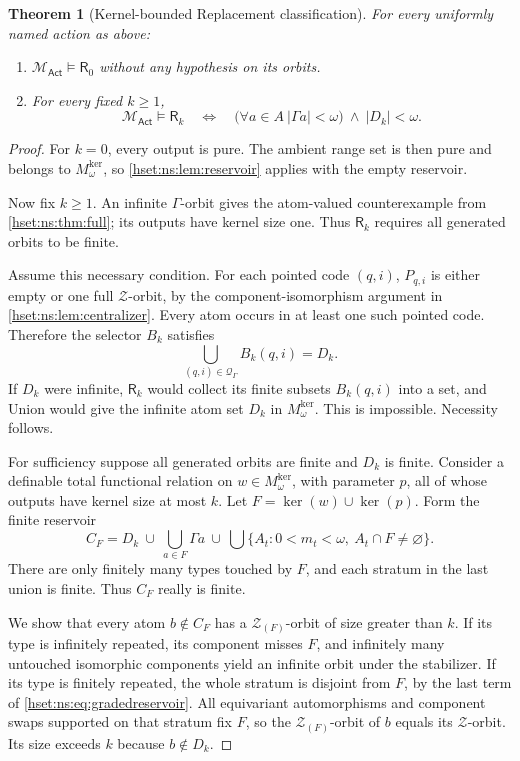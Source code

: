 \documentclass[11pt,letterpaper]{article}
\newtheorem{theorem}{Theorem}[section]
\theoremstyle{definition}
\theoremstyle{remark}
\newcommand{\kerat}{\operatorname{ker}}
\newcommand{\Mker}{M^{\mathrm{ker}}}
\newcommand{\Act}{\mathsf{Act}}
\newcommand{\MAct}{\mathcal M_{\Act}}
\newcommand{\abs}[1]{\lvert #1\rvert}
\newcommand{\calQ}{\mathcal Q_{\Gamma}}
\begin{document}
\begin{theorem}[Kernel-bounded Replacement classification]\label{hset:ns:thm:graded}
For every uniformly named action as above:
\begin{enumerate}
\item $\MAct\models\mathsf R_0$ without any hypothesis on its orbits.
\item For every fixed $k\ge1$,
\[
 \boxed{\quad
 \MAct\models\mathsf R_k
 \quad\Longleftrightarrow\quad
 \bigl(\forall a\in A\ \abs{\Gamma a}<\omega\bigr)
 \ \land\ \abs{D_k}<\omega.
 \quad}
\]
\end{enumerate}
\end{theorem}
\begin{proof}
For $k=0$, every output is pure. The ambient range set is then pure and belongs to $\Mker_\omega$, so \cref{hset:ns:lem:reservoir} applies with the empty reservoir.

Now fix $k\ge1$. An infinite $\Gamma$-orbit gives the atom-valued counterexample from \cref{hset:ns:thm:full}; its outputs have kernel size one. Thus $\mathsf R_k$ requires all generated orbits to be finite.

Assume this necessary condition. For each pointed code $(q,i)$, $P_{q,i}$ is either empty or one full $\mathcal Z$-orbit, by the component-isomorphism argument in \cref{hset:ns:lem:centralizer}. Every atom occurs in at least one such pointed code. Therefore the selector $B_k$ satisfies
\[
 \bigcup_{(q,i)\in\calQ}B_k(q,i)=D_k.
\]
If $D_k$ were infinite, $\mathsf R_k$ would collect its finite subsets $B_k(q,i)$ into a set, and Union would give the infinite atom set $D_k$ in $\Mker_\omega$. This is impossible. Necessity follows.

For sufficiency suppose all generated orbits are finite and $D_k$ is finite. Consider a definable total functional relation on $w\in \Mker_\omega$, with parameter $p$, all of whose outputs have kernel size at most $k$. Let $F=\kerat(w)\cup\kerat(p)$. Form the finite reservoir
\begin{equation}\label{hset:ns:eq:gradedreservoir}
 C_F=D_k\ \cup\ \bigcup_{a\in F}\Gamma a\ \cup\
 \bigcup\{A_t:0<m_t<\omega,\ A_t\cap F\ne\varnothing\}.
\end{equation}
There are only finitely many types touched by $F$, and each stratum in the last union is finite. Thus $C_F$ really is finite.

We show that every atom $b\notin C_F$ has a $\mathcal Z_{(F)}$-orbit of size greater than $k$. If its type is infinitely repeated, its component misses $F$, and infinitely many untouched isomorphic components yield an infinite orbit under the stabilizer. If its type is finitely repeated, the whole stratum is disjoint from $F$, by the last term of \eqref{hset:ns:eq:gradedreservoir}. All equivariant automorphisms and component swaps supported on that stratum fix $F$, so the $\mathcal Z_{(F)}$-orbit of $b$ equals its $\mathcal Z$-orbit. Its size exceeds $k$ because $b\notin D_k$.


\end{proof}
\end{document}
